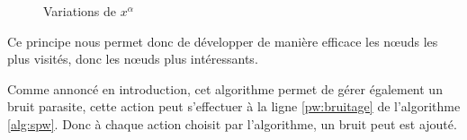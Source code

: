 \documentclass[pdftex,french, english]{article}	%
\begin{document}
		\begin{figure}[H]
			\centering
			\caption{Variations de $x^\alpha$} \label{fig:variationsXPuissanceAlpha}
		\end{figure}

		Ce principe nous permet donc de développer de manière efficace les nœuds les plus visités, donc les nœuds plus intéressants.
        
       Comme annoncé en introduction, cet algorithme permet de gérer également un bruit parasite, cette action peut s'effectuer à la ligne \ref{pw:bruitage} de l'algorithme \ref{alg:spw}. Donc à chaque action choisit par l'algorithme, un bruit peut est ajouté. 
       
\end{document}
